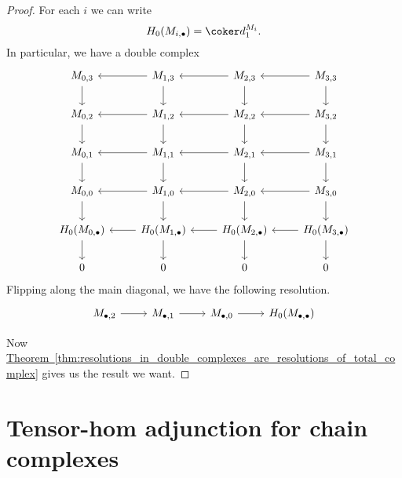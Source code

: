 \documentclass[main.tex]{subfiles}
\begin{document}
\begin{proof}
  For each $i$ we can write
  \begin{equation*}
    H_{0}(M_{i, \bullet}) = \coker d^{M_{i}}_{1}.
  \end{equation*}
  In particular, we have a double complex
  \begin{equation*}
    \begin{tikzcd}
      M_{0,3}
      \arrow[d]
      & M_{1,3}
      \arrow[d]
      \arrow[l]
      & M_{2,3}
      \arrow[d]
      \arrow[l]
      & M_{3,3}
      \arrow[d]
      \arrow[l]
      \\
      M_{0,2}
      \arrow[d]
      & M_{1,2}
      \arrow[d]
      \arrow[l]
      & M_{2,2}
      \arrow[d]
      \arrow[l]
      & M_{3,2}
      \arrow[d]
      \arrow[l]
      \\
      M_{0,1}
      \arrow[d]
      & M_{1,1}
      \arrow[d]
      \arrow[l]
      & M_{2,1}
      \arrow[d]
      \arrow[l]
      & M_{3,1}
      \arrow[d]
      \arrow[l]
      \\
      M_{0,0}
      \arrow[d]
      & M_{1,0}
      \arrow[l]
      \arrow[d]
      & M_{2,0}
      \arrow[l]
      \arrow[d]
      & M_{3,0}
      \arrow[l]
      \arrow[d]
      \\
      H_{0}(M_{0,\bullet})
      \arrow[d]
      & H_{0}(M_{1,\bullet})
      \arrow[d]
      \arrow[l]
      & H_{0}(M_{2,\bullet})
      \arrow[d]
      \arrow[l]
      & H_{0}(M_{3,\bullet})
      \arrow[l]
      \arrow[d]
      \\
      0
      & 0
      & 0
      & 0
    \end{tikzcd}
  \end{equation*}
  Flipping along the main diagonal, we have the following resolution.
  \begin{equation*}
    \begin{tikzcd}
      M_{\bullet, 2}
      \arrow[r]
      & M_{\bullet, 1}
      \arrow[r]
      & M_{\bullet, 0}
      \arrow[r]
      & H_{0}(M_{\bullet, \bullet})
    \end{tikzcd}
  \end{equation*}

  Now \hyperref[thm:resolutions_in_double_complexes_are_resolutions_of_total_complex]{Theorem~\ref*{thm:resolutions_in_double_complexes_are_resolutions_of_total_complex}} gives us the result we want.
\end{proof}

\section{Tensor-hom adjunction for chain complexes}
\label{sec:tensor_hom_adjunction_for_chain_complexes}
\end{document}
